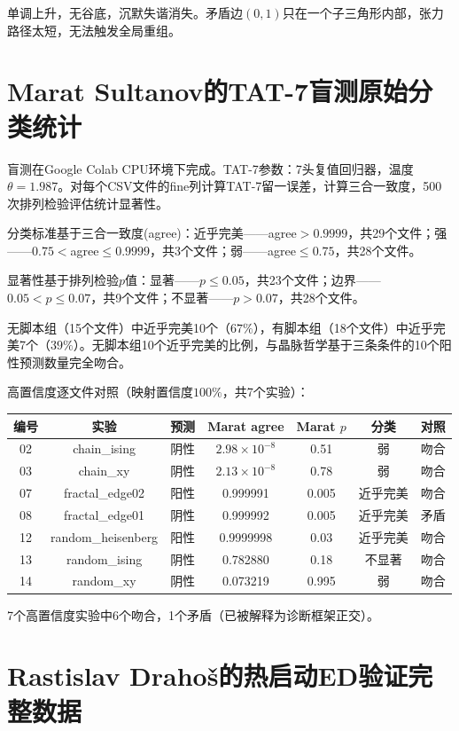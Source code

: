 \documentclass[11pt,a4paper]{book}
\theoremstyle{definition}
\begin{document}
单调上升，无谷底，沉默失谐消失。矛盾边$(0,1)$只在一个子三角形内部，张力路径太短，无法触发全局重组。

\chapter{Marat Sultanov的TAT-7盲测原始分类统计}

盲测在Google Colab CPU环境下完成。TAT-7参数：7头复值回归器，温度$\theta=1.987$。对每个CSV文件的fine列计算TAT-7留一误差，计算三合一致度，500次排列检验评估统计显著性。

分类标准基于三合一致度(agree)：近乎完美——agree$>0.9999$，共29个文件；强——$0.75<$agree$\le0.9999$，共3个文件；弱——agree$\le0.75$，共28个文件。

显著性基于排列检验$p$值：显著——$p\le0.05$，共23个文件；边界——$0.05<p\le0.07$，共9个文件；不显著——$p>0.07$，共28个文件。

无脚本组（15个文件）中近乎完美10个（$67\%$），有脚本组（18个文件）中近乎完美7个（$39\%$）。无脚本组10个近乎完美的比例，与晶脉哲学基于三条条件的10个阳性预测数量完全吻合。

高置信度逐文件对照（映射置信度$100\%$，共7个实验）：

\begin{table}[h]
\centering
\begin{tabular}{ccccccc}
\toprule
编号 & 实验 & 预测 & Marat agree & Marat $p$ & 分类 & 对照 \\
\midrule
02 & chain\_ising & 阴性 & $2.98\times10^{-8}$ & 0.51 & 弱 & 吻合 \\
03 & chain\_xy & 阴性 & $2.13\times10^{-8}$ & 0.78 & 弱 & 吻合 \\
07 & fractal\_edge02 & 阳性 & 0.999991 & 0.005 & 近乎完美 & 吻合 \\
08 & fractal\_edge01 & 阴性 & 0.999992 & 0.005 & 近乎完美 & 矛盾 \\
12 & random\_heisenberg & 阳性 & 0.9999998 & 0.03 & 近乎完美 & 吻合 \\
13 & random\_ising & 阴性 & 0.782880 & 0.18 & 不显著 & 吻合 \\
14 & random\_xy & 阴性 & 0.073219 & 0.995 & 弱 & 吻合 \\
\bottomrule
\end{tabular}
\end{table}

7个高置信度实验中6个吻合，1个矛盾（已被解释为诊断框架正交）。

\chapter{Rastislav Drahoš的热启动ED验证完整数据}
\end{document}
